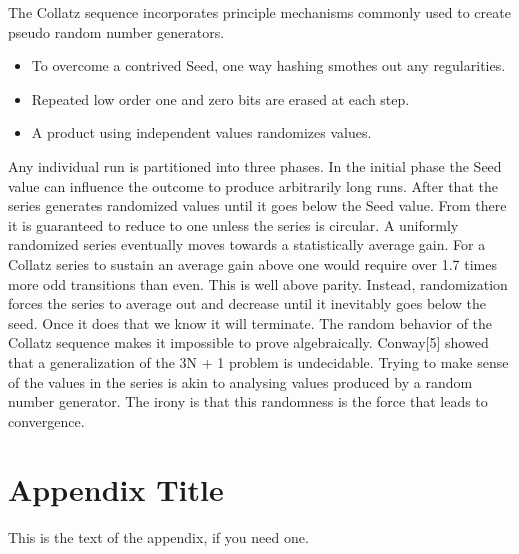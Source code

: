 \documentclass[preprint]{sigplanconf}
\begin{document}
The Collatz sequence incorporates principle mechanisms commonly used to create pseudo random number generators.

\begin{itemize}
    \item To overcome a contrived Seed, one way hashing smothes out any regularities.
    \item Repeated low order one and zero bits are erased at each step.
    \item A product using independent values randomizes values.
\end{itemize}
Any individual run is partitioned into three phases. In the initial phase the Seed value can influence the outcome to produce arbitrarily long runs. After that the series generates randomized values until it goes below the Seed value. From there it is guaranteed to reduce to one unless the series is circular.
A uniformly randomized series eventually moves towards a statistically average gain. For a Collatz series to sustain an average gain above one would require over 1.7 times more odd transitions than even. This is well above parity. Instead, randomization forces the series to average out and decrease until it inevitably goes below the seed. Once it does that we know it will terminate.
The random behavior of the Collatz sequence makes it impossible to prove algebraically. Conway[5] showed that a generalization of the 3N + 1 problem is undecidable. Trying to make sense of the values in the series is akin to analysing values produced by a random number generator. The irony is that this randomness is the force that leads to convergence.


\appendix
\section{Appendix Title}

This is the text of the appendix, if you need one.


\end{document}
